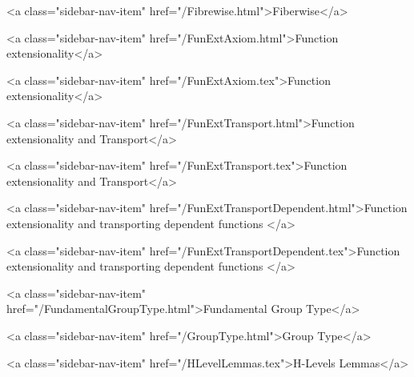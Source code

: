       
    
      
        
          <a class="sidebar-nav-item" href="/Fibrewise.html">Fiberwise</a>
        
      
    
      
        
          <a class="sidebar-nav-item" href="/FunExtAxiom.html">Function extensionality</a>
        
      
    
      
        
          <a class="sidebar-nav-item" href="/FunExtAxiom.tex">Function extensionality</a>
        
      
    
      
        
          <a class="sidebar-nav-item" href="/FunExtTransport.html">Function extensionality and Transport</a>
        
      
    
      
        
          <a class="sidebar-nav-item" href="/FunExtTransport.tex">Function extensionality and Transport</a>
        
      
    
      
        
          <a class="sidebar-nav-item" href="/FunExtTransportDependent.html">Function extensionality and transporting dependent functions </a>
        
      
    
      
        
          <a class="sidebar-nav-item" href="/FunExtTransportDependent.tex">Function extensionality and transporting dependent functions </a>
        
      
    
      
        
          <a class="sidebar-nav-item" href="/FundamentalGroupType.html">Fundamental Group Type</a>
        
      
    
      
        
          <a class="sidebar-nav-item" href="/GroupType.html">Group Type</a>
        
      
    
      
        
          <a class="sidebar-nav-item" href="/HLevelLemmas.tex">H-Levels Lemmas</a>
        
      
    
